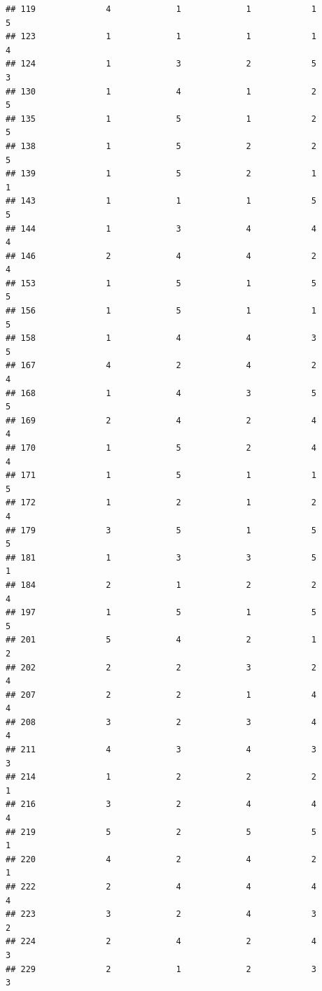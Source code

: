 \documentclass[
]{article}
\begin{document}
\begin{verbatim}
## 119              4             1             1            1          5
## 123              1             1             1            1          4
## 124              1             3             2            5          3
## 130              1             4             1            2          5
## 135              1             5             1            2          5
## 138              1             5             2            2          5
## 139              1             5             2            1          1
## 143              1             1             1            5          5
## 144              1             3             4            4          4
## 146              2             4             4            2          4
## 153              1             5             1            5          5
## 156              1             5             1            1          5
## 158              1             4             4            3          5
## 167              4             2             4            2          4
## 168              1             4             3            5          5
## 169              2             4             2            4          4
## 170              1             5             2            4          4
## 171              1             5             1            1          5
## 172              1             2             1            2          4
## 179              3             5             1            5          5
## 181              1             3             3            5          1
## 184              2             1             2            2          4
## 197              1             5             1            5          5
## 201              5             4             2            1          2
## 202              2             2             3            2          4
## 207              2             2             1            4          4
## 208              3             2             3            4          4
## 211              4             3             4            3          3
## 214              1             2             2            2          1
## 216              3             2             4            4          4
## 219              5             2             5            5          1
## 220              4             2             4            2          1
## 222              2             4             4            4          4
## 223              3             2             4            3          2
## 224              2             4             2            4          3
## 229              2             1             2            3          3

\end{verbatim}
\end{document}
